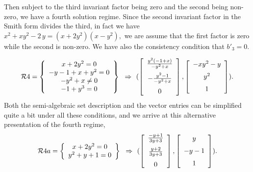 %
%
%
Then subject to the third invariant factor being zero and the second being non-zero,
we have a fourth solution regime.
Since the second invariant factor in the Smith form divides the third, in fact we have
${x}^{2}+x{y}^{2}-2\,y = (x + 2y^2)(x-{y}^{2}),$
we are assume that the first factor is zero while the second is non-zero.  
We have also the consistency condition that $b'_3 = 0$.
 
\[\RR4 = 
\breg x + 2y^2 = 0\\ -y-1+x+{y}^{2}=0\\-{y}^{2}+x\neq 0\\-1+{y}^{3}=0\ereg \implies 
(\left [\begin {array}{c} {\frac {{y}^{2}\left (-1+x\right )}{-{y}^{2}+x
}}\\\noalign{\medskip}-{\frac {{y}^{2}-1}{-{y}^{2}+x}}\\\noalign{\medskip}
0\end {array}\right ]
,
\left [\begin {array}{c} -x{y}^{2}-y\\\noalign{\medskip}{y}^{2}\\\noalign{\medskip}
1\end {array}\right ]
).
\]
Both the semi-algebraic set description and the vector entries can be simplified quite 
a bit under all these conditions, and we arrive at this alternative presentation of the
fourth regime,
\[\RR4a = 
\breg x + 2y^2 = 0\\ y^2 + y + 1 = 0\ereg \implies
(\left [\begin {array}{c} 
{\frac {-y+1}{3y+3}}\\\noalign{\medskip}
{\frac {y+2}{3y+3}}\\\noalign{\medskip}
0\end {array}\right ]
,
\left [\begin {array}{c} 
y\\\noalign{\medskip}
-y-1\\\noalign{\medskip}
1\end {array}\right ]
).
\]

